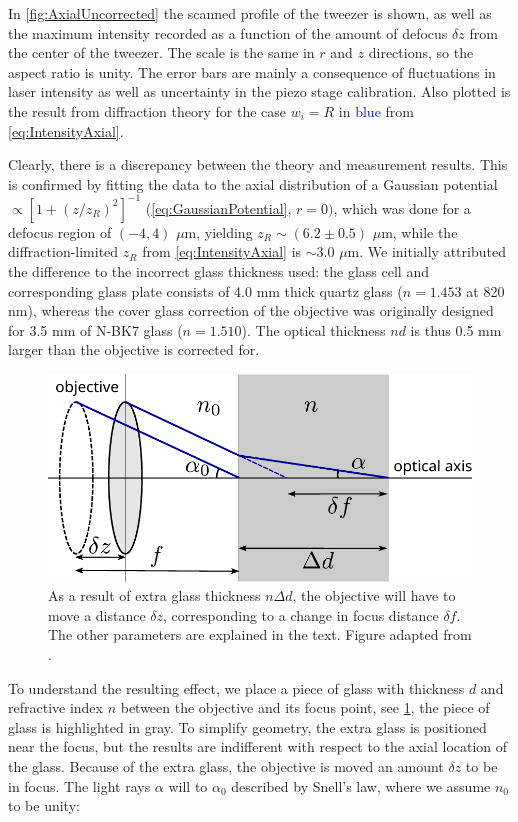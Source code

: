 In \cref{fig:AxialUncorrected} the scanned profile of the tweezer is shown, as well as the maximum intensity recorded as a function of the amount of defocus $\delta z$ from the center of the tweezer.
The scale is the same in $r$ and $z$ directions, so the aspect ratio is unity.
The error bars are mainly a consequence of fluctuations in laser intensity as well as uncertainty in the piezo stage calibration.
Also plotted is the result from diffraction theory for the case $w_i =R$ in \textcolor{blue}{blue} from \cref{eq:IntensityAxial}.

Clearly, there is a discrepancy between the theory and measurement results.
This is confirmed by fitting the data to the axial distribution of a Gaussian potential $\propto [1+(z/z_R)^2]^{-1}$ (\cref{eq:GaussianPotential}, $r=0)$, which was done for a defocus region of $(-4, 4)$ $\mu$m, yielding $z_R \sim (6.2\pm0.5)$ $\mu$m, while the diffraction-limited $z_R$ from \cref{eq:IntensityAxial} is $\sim 3.0$ $\mu$m.
We initially attributed the difference to the incorrect glass thickness used: the glass cell and corresponding glass plate consists of 4.0 mm thick quartz glass ($n=1.453$ at 820 nm), whereas the cover glass correction of the objective was originally designed for 3.5 mm of N-BK7 glass ($n=1.510$).
The optical thickness $nd$ is thus 0.5 mm larger than the objective is corrected for. 
\begin{figure}[]
    \centering
    \includegraphics[width=0.61\linewidth]{figures/sphericalAberration.pdf}
    \caption{As a result of extra glass thickness $n\Delta d$, the objective will have to move a distance $\delta z$, corresponding to a change in focus distance $\delta f$.
    The other parameters are explained in the text.
    Figure adapted from \cite{Iwaniuk2011}.}
    \label{fig:SphericalSketch}
\end{figure}
To understand the resulting effect, we place a piece of glass with thickness $d$ and refractive index $n$ between the objective and its focus point, see \cref{fig:SphericalSketch}, the piece of glass is highlighted in gray.
To simplify geometry, the extra glass is positioned near the focus, but the results are indifferent with respect to the axial location of the glass.
Because of the extra glass, the objective is moved an amount $\delta z$ to be in focus.
The light rays $\alpha$ will to $\alpha_0$ described by Snell's law, where we assume $n_0$ to be unity:

